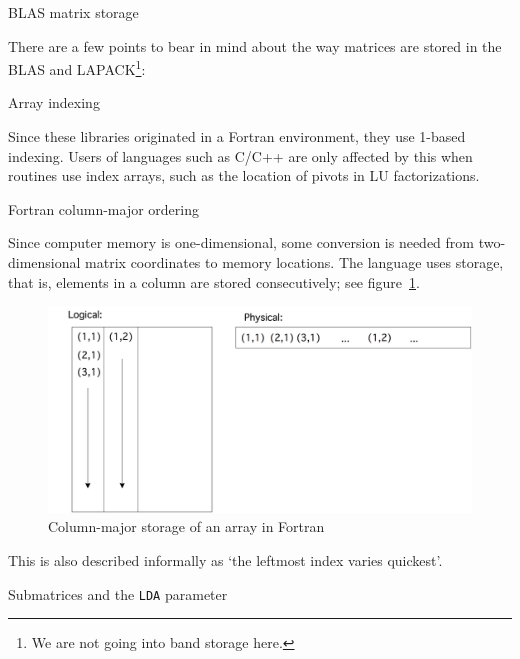  {BLAS matrix storage}

There are a few points to bear in mind about the way matrices are
stored in the BLAS and LAPACK\footnote{We are not going into band
  storage here.}:

 {Array indexing}

Since these libraries originated in a Fortran environment, they
  use 1-based indexing. Users of languages such as C/C++ are only
  affected by this when routines use index arrays, such as the
  location of pivots in LU factorizations.

 {Fortran column-major ordering}

Since computer memory is one-dimensional, some conversion is needed
from two-dimensional matrix coordinates to memory locations. The
 language uses  storage, that is,
elements in a column are stored consecutively; see
figure~\ref{fig:densearray}.
\begin{figure}
  \includegraphics[scale=.14]{graphics-public/densearray}
  \caption{Column-major storage of an array in Fortran}
  \label{fig:densearray}
\end{figure}
This is also described informally as `the leftmost index varies
quickest'.

 {Submatrices and the {\tt LDA} parameter}

